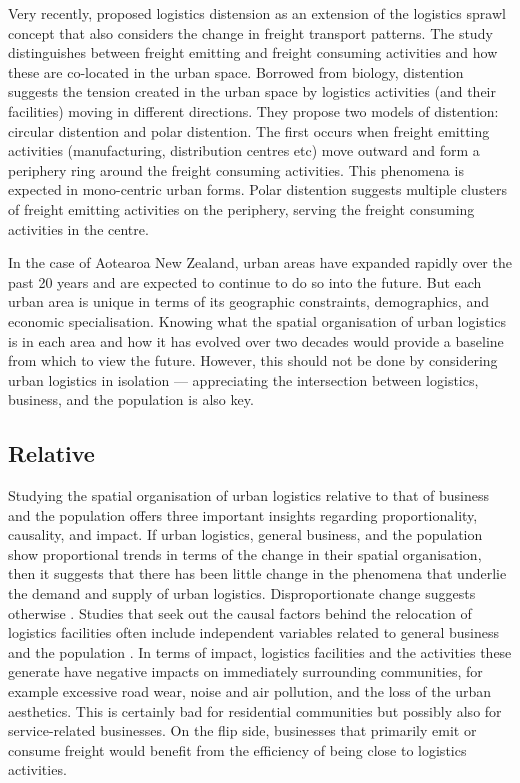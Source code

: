 \documentclass[3p, a4paper, authoryear, 11pt, fleqn, review]{elsarticle}
\newcommand{\nmt}[1]{{\color{ForestGreen}{~(nmt: #1)}}}
\begin{document}
 Very recently, \citet{Gardrat2021} proposed logistics distension as an extension of the logistics sprawl concept that also considers the change in freight transport patterns. The study distinguishes between freight emitting and freight consuming activities and how these are co-located in the urban space. Borrowed from biology, distention suggests the tension created in the urban space by logistics activities (and their facilities) moving in different directions. They propose two models of distention: circular distention and polar distention. The first occurs when freight emitting activities (manufacturing, distribution centres etc) move outward and form a periphery ring around the freight consuming activities. This phenomena is expected in mono-centric urban forms. Polar distention suggests multiple clusters of freight emitting activities on the periphery, serving the freight consuming activities in the centre.
 
In the case of Aotearoa New Zealand, urban areas have expanded rapidly over the past 20 years and are expected to continue to do so into the future. But each urban area is unique in terms of its geographic constraints, demographics, and economic specialisation. Knowing what the spatial organisation of urban logistics is in each area and how it has evolved over two decades would provide a baseline from which to view the future. However, this should not be done by considering urban logistics in isolation --- appreciating the intersection between logistics, business, and the population is also key. 


\subsection{Relative}

Studying the spatial organisation of urban logistics relative to that of business and the population offers three important insights regarding proportionality, causality, and impact. If urban logistics, general business, and the population show proportional trends in terms of the change in their spatial organisation, then it suggests that there has been little change in the phenomena \nmt{other word, but not factor} that underlie the demand and supply of urban logistics. Disproportionate change suggests otherwise \nmt{examples of studies}. Studies that seek out the causal factors behind the relocation of logistics facilities often include independent variables related to general business and the population \nmt{refs}. In terms of impact, logistics facilities and the activities these generate have negative impacts on immediately surrounding communities, for example excessive road wear, noise and air pollution, and the loss of the urban aesthetics. This is certainly bad for residential communities but possibly also for service-related businesses. On the flip side, businesses that primarily emit or consume freight would benefit from the efficiency of being close to logistics activities.  \nmt{Not sure about one long para here}
\end{document}
